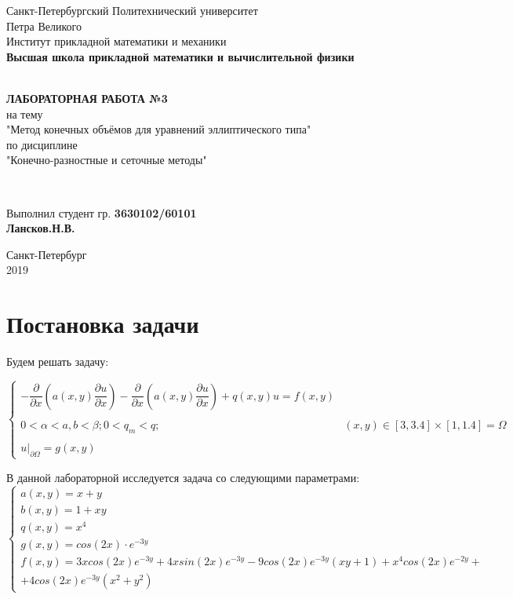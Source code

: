 \documentclass[12pt]{article}
\renewcommand{\listoffigures}{\begingroup  %
\tocsection
\tocfile{\listfigurename}{lof}
\endgroup}
\renewcommand{\listoftables}{\begingroup  %
\tocsection
\tocfile{\listtablename}{lot}
\endgroup}
\begin{document}
\begin{titlepage}
	\center
		Санкт-Петербургский Политехнический 
		университет \\ Петра Великого\\
		Институт прикладной математики и механики
		\\ \textbf{Высшая школа прикладной математики и вычислительной физики}

	\vfill ~
	\textbf{
		\\ \large ЛАБОРАТОРНАЯ РАБОТА №3
	}
	\\	на тему 
	\\ "Метод конечных объёмов для уравнений эллиптического типа"
	\\ по дисциплине
	\\ "Конечно-разностные и сеточные методы"

	\vfill ~

	Выполнил студент гр. \textbf{3630102/60101} \\
	\textbf{Лансков.Н.В.} \\ 

\vfill

{\large}	Санкт-Петербург
\\ 2019
\end{titlepage}


\tableofcontents 
\newpage
\listoffigures
\newpage
\listoftables
\newpage

\section{Постановка задачи}

Будем решать задачу:

$$
\begin{cases}
-\dfrac{\partial}{\partial x}\left( a(x,y) \dfrac{\partial u}{\partial x}\right) - \dfrac{\partial}{\partial x}\left( a(x,y) \dfrac{\partial u}{\partial x}\right) + q(x,y)u = f(x,y)
\\ \\
0 < \alpha < a, b < \beta; 0 < q_m < q; & (x,y) \in [3, 3.4] \times [1, 1.4] = \Omega
\\ \\
u|_{\partial \Omega} = g(x, y)
\end{cases}
$$

В данной лабораторной исследуется задача со следующими параметрами:
$$
\begin{cases}
a(x,y) = x + y \\ 
b(x,y) = 1 + xy \\
q(x,y) = x^4 \\
g(x,y) = cos(2x) \cdot e^{-3y} \\
f(x,y) = 3xcos(2x)e^{-3y}+4xsin(2x)e^{-3y} - 9cos(2x)e^{-3y}(xy + 1) + x^4cos(2x)e^{-2y} + \\ + 4cos(2x)e^{-3y}(x^2 + y^2)
\end{cases}
$$
\end{document}
